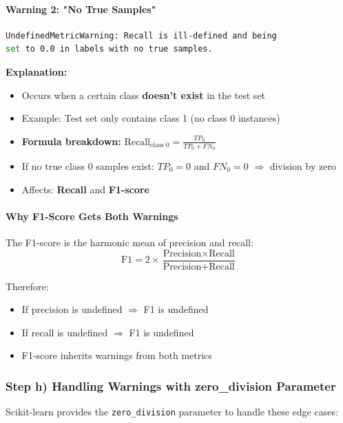 \documentclass[12pt,a4paper]{article}
\begin{document}
\paragraph{Warning 2: "No True Samples"}

\begin{lstlisting}[language=bash, frame=single]
UndefinedMetricWarning: Recall is ill-defined and being 
set to 0.0 in labels with no true samples.
\end{lstlisting}

\textbf{Explanation:}
\begin{itemize}
    \item Occurs when a certain class \textbf{doesn't exist} in the test set
    \item Example: Test set only contains class 1 (no class 0 instances)
    \item \textbf{Formula breakdown:} $\text{Recall}_{\text{class 0}} = \frac{TP_0}{TP_0 + FN_0}$
    \item If no true class 0 samples exist: $TP_0 = 0$ and $FN_0 = 0$ $\Rightarrow$ division by zero
    \item Affects: \textbf{Recall} and \textbf{F1-score}
\end{itemize}

\paragraph{Why F1-Score Gets Both Warnings}

The F1-score is the harmonic mean of precision and recall:
$$\text{F1} = 2 \times \frac{\text{Precision} \times \text{Recall}}{\text{Precision} + \text{Recall}}$$

Therefore:
\begin{itemize}
    \item If precision is undefined $\Rightarrow$ F1 is undefined
    \item If recall is undefined $\Rightarrow$ F1 is undefined
    \item F1-score inherits warnings from both metrics
\end{itemize}

\subsubsection{Step h) Handling Warnings with zero\_division Parameter}

Scikit-learn provides the \texttt{zero\_division} parameter to handle these edge cases:
\end{document}

